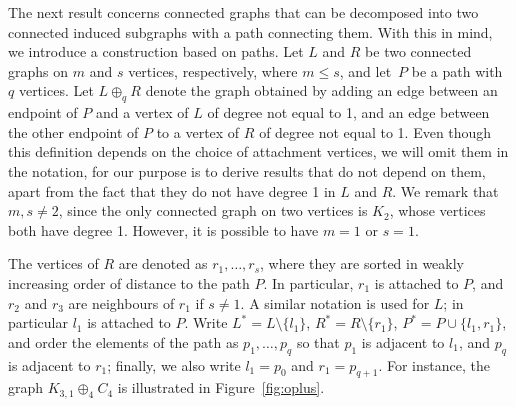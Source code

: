 The next result concerns connected graphs that can be decomposed into two
connected induced subgraphs with a path connecting them. With this in mind, we
introduce a construction based on paths. Let $L$ and $R$ be two connected
graphs on $m$ and $s$ vertices, respectively, where $m \le s$, and let~$P$ be a
path with $q$ vertices. Let $L \oplus_q R$ denote the graph obtained by adding
an edge between an endpoint of $P$ and a vertex of $L$ of degree not equal to
1, and an edge between the other endpoint of $P$ to a vertex of $R$ of degree
not equal to 1. Even though this definition depends on the choice of
attachment vertices, we will omit them in the notation, for our purpose is to
derive results that do not depend on them, apart from the fact that they do not
have degree 1 in $L$ and $R$. We remark that $m, s \ne 2$, since the only
connected graph on two vertices is $K_2$, whose vertices both have degree 1.
However, it is possible to have $m=1$ or $s=1$.

The vertices of $R$ are denoted as $r_1, \dots, r_s$, where they are sorted in
weakly increasing order of distance to the path $P$. In particular, $r_1$ is
attached to $P$, and $r_2$ and $r_3$ are neighbours of $r_1$ if $s\not=1$. A
similar notation is used for $L$; in particular $l_1$ is attached to $P$. Write
$L^* = L \setminus \{ l_1 \}$, $R^* = R \setminus \{ r_1 \}$, $P^* = P \cup
\{l_1, r_1\}$, and order the elements of the path as $p_1, \dots, p_q$ so that
$p_1$ is adjacent to $l_1$, and $p_q$ is adjacent to $r_1$; finally, we also
write $l_1 = p_0$ and $r_1 = p_{q+1}$. For instance, the graph $K_{3,1}
\oplus_4 C_4$ is illustrated in Figure~\ref{fig:oplus}.

